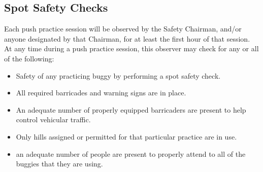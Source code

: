 \subsection{Spot Safety Checks}

	Each push practice session will be observed by the Safety Chairman, and/or anyone designated by that Chairman, for at least the first hour of that session. At any time during a push practice session, this observer may check for any or all of the following:

	\begin{itemize}

		\item Safety of any practicing buggy by performing a spot safety check.

		\item All required barricades and warning signs are in place.

		\item An adequate number of properly equipped barricaders are present to help control vehicular traffic.

		\item Only hills assigned or permitted for that particular practice are in use.

		\item an adequate number of people are present to properly attend to all of the buggies that they are using.

	\end{itemize}


